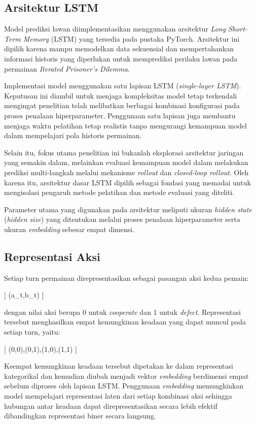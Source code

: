 \subsection{Arsitektur LSTM}

Model prediksi lawan diimplementasikan menggunakan arsitektur \textit{Long Short-Term Memory} (LSTM) yang tersedia pada pustaka PyTorch. Arsitektur ini dipilih karena mampu memodelkan data sekuensial dan mempertahankan informasi historis yang diperlukan untuk memprediksi perilaku lawan pada permainan \textit{Iterated Prisoner's Dilemma}.

Implementasi model menggunakan satu lapisan LSTM (\textit{single-layer LSTM}). Keputusan ini diambil untuk menjaga kompleksitas model tetap terkendali mengingat penelitian telah melibatkan berbagai kombinasi konfigurasi pada proses penalaan hiperparameter. Penggunaan satu lapisan juga membantu menjaga waktu pelatihan tetap realistis tanpa mengurangi kemampuan model dalam mempelajari pola historis permainan.

Selain itu, fokus utama penelitian ini bukanlah eksplorasi arsitektur jaringan yang semakin dalam, melainkan evaluasi kemampuan model dalam melakukan prediksi multi-langkah melalui mekanisme \textit{rollout} dan \textit{closed-loop rollout}. Oleh karena itu, arsitektur dasar LSTM dipilih sebagai fondasi yang memadai untuk mengisolasi pengaruh metode pelatihan dan metode evaluasi yang diteliti.

Parameter utama yang digunakan pada arsitektur meliputi ukuran \textit{hidden state} (\textit{hidden size}) yang ditentukan melalui proses penalaan hiperparameter serta ukuran \textit{embedding} sebesar empat dimensi.

\subsection{Representasi Aksi}

Setiap turn permainan direpresentasikan sebagai pasangan aksi kedua pemain:

[
(a_t,b_t)
]

dengan nilai aksi berupa 0 untuk \textit{cooperate} dan 1 untuk \textit{defect}. Representasi tersebut menghasilkan empat kemungkinan keadaan yang dapat muncul pada setiap turn, yaitu:

[
(0,0),\quad (0,1),\quad (1,0),\quad (1,1)
]

Keempat kemungkinan keadaan tersebut dipetakan ke dalam representasi kategorikal dan kemudian diubah menjadi vektor \textit{embedding} berdimensi empat sebelum diproses oleh lapisan LSTM. Penggunaan \textit{embedding} memungkinkan model mempelajari representasi laten dari setiap kombinasi aksi sehingga hubungan antar keadaan dapat direpresentasikan secara lebih efektif dibandingkan representasi biner secara langsung.

